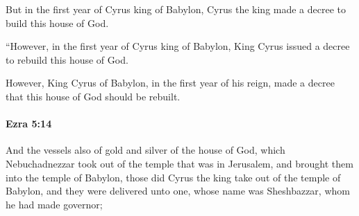 			\begin{versebox}
					\item[BHS] 
					\item[LXX] 
					\item[ASV] But in the first year of Cyrus king of Babylon, Cyrus the king made a decree to build this house of God.
					\item[NIV] “However, in the first year of Cyrus king of Babylon, King Cyrus issued a decree to rebuild this house of God.
					\item[NRSV] However, King Cyrus of Babylon, in the first year of his reign, made a decree that this house of God should be rebuilt.
			\end{versebox}

		\paragraph{Ezra 5:14} %
			\label{EZRA-5-14}

			And the vessels also of gold and silver of the house of God, which Nebuchadnezzar took out of the temple that was in Jerusalem, and brought them into the temple of Babylon, those did Cyrus the king take out of the temple of Babylon, and they were delivered unto one, whose name was Sheshbazzar, whom he had made governor;

